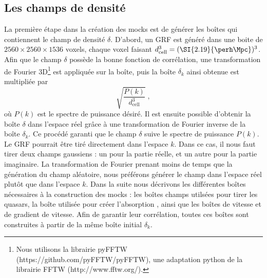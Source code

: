 \subsection{Les champs de densité}
\label{subsec:densityfields}
La première étape dans la création des mocks est de générer les boîtes qui contiennent le champ de densité $\delta$. D'abord, un GRF est généré dans une boite de $\num{2560}\times\num{2560}\times\num{1536}$ voxels, chaque voxel faisant  $d_{\mathrm{cell}}^3 = (\SI{2.19}{\perh\Mpc})^3$.
Afin que le champ $\delta$ possède la bonne fonction de corrélation, une transformation de Fourier 3D\footnote{Nous utilisons la librairie pyFFTW (https://github.com/pyFFTW/pyFFTW), une adaptation python de la librairie FFTW (http://www.fftw.org/).} est appliquée sur la boîte, puis la boîte $\delta_k$ ainsi obtenue est multipliée par
\begin{equation}
  \sqrt{\frac{P(k)}{d_{\mathrm{cell}}^3}} \; ,
\end{equation}
où $P(k)$ est le spectre de puissance désiré. Il est ensuite possible d'obtenir la boîte $\delta$ dans l'espace réel grâce à une transformation de Fourier inverse de la boîte $\delta_k$. Ce procédé garanti que le champ $\delta$ suive le spectre de puissance $P(k)$. 
Le GRF pourrait être tiré directement dans l'espace $k$. Dans ce cas, il nous faut tirer deux champs gaussiens : un pour la partie réelle, et un autre pour la partie imaginaire. La transformation de Fourier prenant moins de temps que la génération du champ aléatoire, nous préférons générer le champ dans l'espace réel plutôt que dans l'espace $k$.
Dans la suite nous décrivons les différentes boîtes nécessaires à la construction des mocks : les boîtes champs utilsées pour tirer les quasars, la boîte utilisée pour créer l'absorption \lya{}, ainsi que les boîtes de vitesse et de gradient de vitesse. Afin de garantir leur corrélation, toutes ces boîtes sont construites à partir de la même boîte initial $\delta_k$.

